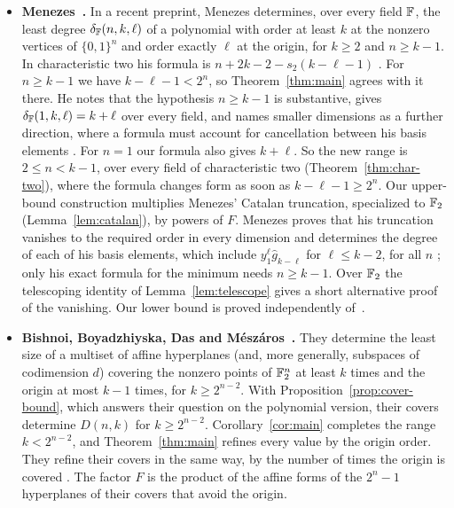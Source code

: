 \begin{itemize}
 \item \textbf{Menezes~\cite{Men26}.} In a recent preprint, Menezes determines,
 over every field \(\mathbb F\), the least degree \(\delta_\mathbb F(n,k,\ell)\) of a polynomial
 with order at least \(k\) at the nonzero vertices of \(\{0,1\}^n\) and order
 exactly \(\ell\) at the origin, for \(k\ge2\) and \(n\ge k-1\). In characteristic
 two his formula is \(n+2k-2-s_2(k-\ell-1)\) \cite[Corollary~1.3]{Men26}. For
 \(n\ge k-1\) we have \(k-\ell-1<2^n\), so Theorem~\ref{thm:main} agrees with it
 there. He notes that the hypothesis \(n\ge k-1\) is substantive, gives
 \(\delta_\mathbb F(1,k,\ell)=k+\ell\) over every field, and names smaller dimensions as
 a further direction, where a formula must account for cancellation between his
 basis elements \cite[Section~8]{Men26}. For \(n=1\) our formula also gives
 \(k+\ell\). So the new range is \(2\le n<k-1\), over every field of characteristic
 two (Theorem~\ref{thm:char-two}), where the formula changes form as
 soon as \(k-\ell-1\ge2^n\). Our upper-bound construction multiplies Menezes'
 Catalan truncation, specialized to \(\mathbb F_2\) (Lemma~\ref{lem:catalan}), by powers
 of \(F\). Menezes proves that his truncation vanishes to the required order in
 every dimension \cite[Theorem~3.2]{Men26} and determines the degree of each of
 his basis elements, which include \(y_1^\ell\widehat g_{k-\ell}\) for \(\ell\le k-2\), for all \(n\)
 \cite[Section~8]{Men26}; only his exact formula for the minimum needs
 \(n\ge k-1\). Over \(\mathbb F_2\) the telescoping identity of Lemma~\ref{lem:telescope}
 gives a short alternative proof of the vanishing. Our lower bound is proved
 independently of~\cite{Men26}.
 \item \textbf{Bishnoi, Boyadzhiyska, Das and M\'esz\'aros~\cite{BBDM23}.} They
 determine the least size of a multiset of affine hyperplanes (and, more
 generally, subspaces of codimension \(d\)) covering the nonzero points of
 \(\mathbb F_2^n\) at least \(k\) times and the origin at most \(k-1\) times, for
 \(k\ge2^{n-2}\). With Proposition~\ref{prop:cover-bound}, which answers their
 question on the polynomial version, their covers determine \(D(n,k)\) for
 \(k\ge2^{n-2}\). Corollary~\ref{cor:main} completes the range \(k<2^{n-2}\), and
 Theorem~\ref{thm:main} refines every value by the origin order. They refine
 their covers in the same way, by the number of times the origin is covered
 \cite[Section~2]{BBDM23}. The factor \(F\) is the product of the affine forms of
 the \(2^n-1\) hyperplanes of their covers that avoid the origin.

\end{itemize}
